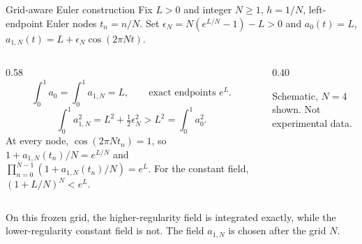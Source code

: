 \documentclass[aspectratio=169,10pt,c]{beamer}
\newcommand{\sourcenote}[1]{{\scriptsize\color{fsgray}#1}}
\begin{document}
\begin{frame}{Grid-aware Euler construction}
  \footnotesize
  Fix \(L>0\) and integer \(N\ge 1\), \(h=1/N\), left-endpoint Euler nodes
  \(t_n=n/N\). Set \(\epsilon_N=N(e^{L/N}-1)-L>0\) and
  \(a_0(t)=L\), \(a_{1,N}(t)=L+\epsilon_N\cos(2\pi Nt)\).

  \begin{columns}[T,onlytextwidth]
    \begin{column}{0.58\textwidth}
      \[
        \int_0^1 a_0=\int_0^1 a_{1,N}=L,
        \qquad
        \text{exact endpoints }e^{L}.
      \]
      \[
        \int_0^1 a_{1,N}^2
        =L^2+\tfrac12\epsilon_N^2
        >L^2=\int_0^1 a_0^2.
      \]
      At every node, \(\cos(2\pi Nt_n)=1\), so
      \(1+a_{1,N}(t_n)/N=e^{L/N}\) and
      \(\prod_{n=0}^{N-1}(1+a_{1,N}(t_n)/N)=e^{L}\).
      For the constant field, \((1+L/N)^N<e^{L}\).
    \end{column}
    \begin{column}{0.40\textwidth}
      \begin{center}
      \end{center}
      \sourcenote{Schematic, \(N=4\) shown. Not experimental data.}
    \end{column}
  \end{columns}

  On this frozen grid, the higher-regularity field is integrated exactly,
  while the lower-regularity constant field is not.
  The field \(a_{1,N}\) is chosen after the grid \(N\).
\end{frame}
\end{document}
